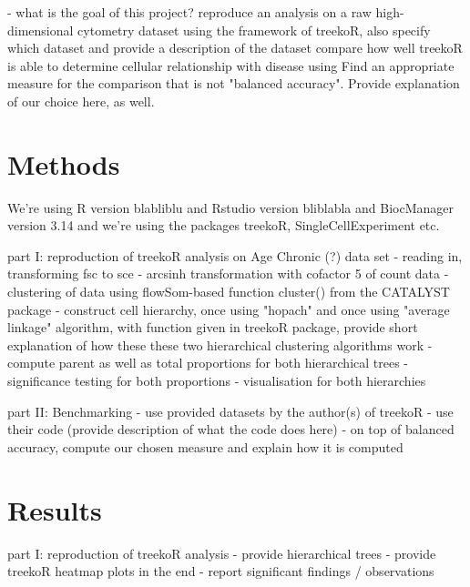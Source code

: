 \documentclass[11pt,a4paper,twoside]{report}\usepackage[]{graphicx}\usepackage[]{color}
\begin{document}
- what is the goal of this project?
reproduce an analysis on a raw high-dimensional cytometry dataset using the framework of treekoR, also specify which dataset and provide a description of the dataset
compare how well treekoR is able to determine cellular relationship with disease using %
Find an appropriate measure for the comparison that is not "balanced accuracy".
Provide explanation of our choice here, as well.




\chapter{Methods} 

We're using R version blabliblu and Rstudio version bliblabla and BiocManager version 3.14 and we're using the packages treekoR, SingleCellExperiment etc.

part I: reproduction of treekoR analysis on Age Chronic (?) data set
- reading in, transforming fsc to sce
- arcsinh transformation with cofactor 5 of count data
- clustering of data using flowSom-based function cluster() from the CATALYST package
- construct cell hierarchy, once using "hopach" and once using "average linkage" algorithm, with function given in treekoR package, provide short explanation of how these these two hierarchical clustering algorithms work
- compute parent as well as total proportions for both hierarchical trees
- significance testing for both proportions
- visualisation for both hierarchies


part II: Benchmarking
- use provided datasets by the author(s) of treekoR
- use their code (provide description of what the code does here)
- on top of balanced accuracy, compute our chosen measure and explain how it is computed




\chapter{Results}\label{sec:results}

part I: reproduction of treekoR analysis
- provide hierarchical trees
- provide treekoR heatmap plots in the end
- report significant findings / observations
\end{document}
